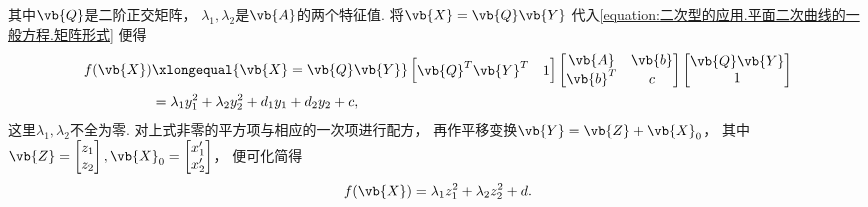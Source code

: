 其中\(\vb{Q}\)是二阶正交矩阵，
\(\lambda_1,\lambda_2\)是\(\vb{A}\)的两个特征值.
将\(\vb{X} = \vb{Q} \vb{Y}\)
代入\cref{equation:二次型的应用.平面二次曲线的一般方程.矩阵形式} 便得\begin{align*}
	f(\vb{X})
	&\xlongequal{\vb{X} = \vb{Q} \vb{Y}}
	\begin{bmatrix}
		\vb{Q}^T \vb{Y}^T & 1
	\end{bmatrix}
	\begin{bmatrix}
		\vb{A} & \vb{b} \\
		\vb{b}^T & c
	\end{bmatrix}
	\begin{bmatrix}
		\vb{Q} \vb{Y} \\ 1
	\end{bmatrix} \\
	&= \lambda_1 y_1^2 + \lambda_2 y_2^2 + d_1 y_1 + d_2 y_2 + c,
\end{align*}
这里\(\lambda_1,\lambda_2\)不全为零.
对上式非零的平方项与相应的一次项进行配方，
再作平移变换\(\vb{Y} = \vb{Z} + \vb{X}_0\)，
其中\(\vb{Z} = \begin{bmatrix}
	z_1 \\ z_2
\end{bmatrix},
\vb{X}_0 = \begin{bmatrix}
	x'_1 \\ x'_2
\end{bmatrix}\)，
便可化简得\[
	f(\vb{X})
	= \lambda_1 z_1^2 + \lambda_2 z_2^2 + d.
\]
